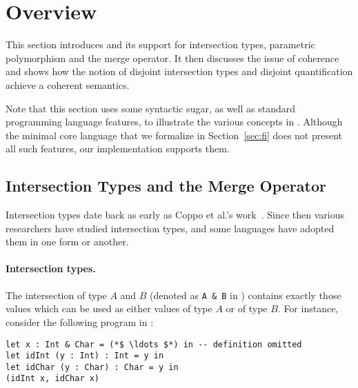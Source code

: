 \section{Overview} \label{sec:overview}

This section introduces \name and its support for intersection types,
parametric polymorphism and the merge operator. 
It then discusses the issue of coherence and shows how the notion of disjoint
intersection types and disjoint quantification achieve a coherent semantics.

Note that this section uses some syntactic sugar, as well as standard
programming language features, to illustrate the various concepts in \name. 
Although the minimal core language that we formalize in
Section~\ref{sec:fi} does not present all such features, our implementation
supports them.

\subsection{Intersection Types and the Merge Operator}

Intersection types date back as early as Coppo et al.'s work~\cite{coppo1981functional}. 
Since then various researchers have studied intersection types, and some languages have 
adopted them in one form or another.

\paragraph{Intersection types.}
The intersection of type $A$ and $B$ (denoted as \lstinline{A & B} in
\name) contains exactly those values
which can be used as either values of type $A$ or of type $B$. 
For instance, consider the following program in \name:

\begin{lstlisting}
let x : Int & Char = (*$ \ldots $*) in -- definition omitted
let idInt (y : Int) : Int = y in
let idChar (y : Char) : Char = y in
(idInt x, idChar x)
\end{lstlisting}

